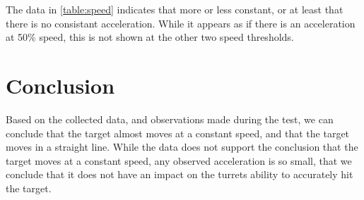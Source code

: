 The data in \autoref{table:speed} indicates that more or less constant, or at
least that there is no consistant acceleration. While it appears as if there is
an acceleration at 50\% speed, this is not shown at the other two speed
thresholds.

\section{Conclusion}
Based on the collected data, and observations made during the test, we can
conclude that the target almost moves at a constant speed, and that the target
moves in a straight line. While the data does not support the conclusion that
the target moves at a constant speed, any observed acceleration is so small,
that we conclude that it does not have an impact on the turrets ability to
accurately hit the target.


